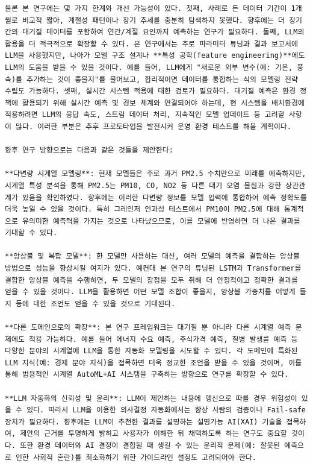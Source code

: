 \documentclass[12pt,ko,a4,]{report}
\begin{document}
\begin{lstlisting}
물론 본 연구에는 몇 가지 한계와 개선 가능성이 있다. 첫째, 사례로 든 데이터 기간이 1개월로 비교적 짧아, 계절성 패턴이나 장기 추세를 충분히 탐색하지 못했다. 향후에는 더 장기간의 대기질 데이터를 포함하여 연간/계절 요인까지 예측하는 연구가 필요하다. 둘째, LLM의 활용을 더 적극적으로 확장할 수 있다. 본 연구에서는 주로 파라미터 튜닝과 결과 보고서에 LLM을 사용했지만, 나아가 모델 구조 설계나 **특성 공학(feature engineering)**에도 LLM의 도움을 받을 수 있을 것이다. 예를 들어, LLM에게 "새로운 외부 변수(예: 기온, 풍속)를 추가하는 것이 좋을지"를 물어보고, 합리적이면 데이터를 통합하는 식의 모델링 전략 수립도 가능하다. 셋째, 실시간 시스템 적용에 대한 검토가 필요하다. 대기질 예측은 환경 정책에 활용되기 위해 실시간 예측 및 경보 체계와 연결되어야 하는데, 현 시스템을 배치환경에 적용하려면 LLM의 응답 속도, 스트림 데이터 처리, 지속적인 모델 업데이트 등 고려할 사항이 많다. 이러한 부분은 추후 프로토타입을 발전시켜 운영 환경 테스트를 해볼 계획이다.

향후 연구 방향으로는 다음과 같은 것들을 제안한다:

**다변량 시계열 모델링**: 현재 모델들은 주로 과거 PM2.5 수치만으로 미래를 예측하지만, 시계열 특성 분석을 통해 PM2.5는 PM10, CO, NO2 등 다른 대기 오염 물질과 강한 상관관계가 있음을 확인하였다. 향후에는 이러한 다변량 정보를 모델 입력에 통합하여 예측 정확도를 더욱 높일 수 있을 것이다. 특히 그레인저 인과성 테스트에서 PM10이 PM2.5에 대해 통계적으로 유의미한 예측력을 가지는 것으로 나타났으므로, 이를 모델에 반영하면 더 나은 결과를 기대할 수 있다.

**앙상블 및 복합 모델**: 한 모델만 사용하는 대신, 여러 모델의 예측을 결합하는 앙상블 방법으로 성능을 향상시킬 여지가 있다. 예컨대 본 연구의 튜닝된 LSTM과 Transformer를 결합한 앙상블 예측을 수행하면, 두 모델의 장점을 모두 취해 더 안정적이고 정확한 결과를 얻을 수 있을 것이다. LLM을 활용하면 어떤 모델 조합이 좋을지, 앙상블 가중치를 어떻게 둘지 등에 대한 조언도 얻을 수 있을 것으로 기대된다.

**다른 도메인으로의 확장**: 본 연구 프레임워크는 대기질 뿐 아니라 다른 시계열 예측 문제에도 적용 가능하다. 예를 들어 에너지 수요 예측, 주식가격 예측, 질병 발생률 예측 등 다양한 분야의 시계열에 LLM을 통한 자동화 모델링을 시도할 수 있다. 각 도메인에 특화된 LLM 지식(예: 경제 분야 지식)을 접목하면 더욱 정교한 조언을 받을 수 있을 것이며, 이를 통해 범용적인 시계열 AutoML+AI 시스템을 구축하는 방향으로 연구를 확장할 수 있다.

**LLM 자동화의 신뢰성 및 윤리**: LLM이 제안하는 내용에 맹신으로 따를 경우 위험성이 있을 수 있다. 따라서 LLM을 이용한 의사결정 자동화에서는 항상 사람의 검증이나 Fail-safe 장치가 필요하다. 향후에는 LLM이 추천한 결과를 설명하는 설명가능 AI(XAI) 기술을 접목하여, 제안의 근거를 투명하게 밝히고 사용자가 이해한 뒤 채택하도록 하는 연구도 중요할 것이다. 또한 환경 데이터와 AI 결정이 결합될 때 생길 수 있는 윤리적 문제(예: 잘못된 예측으로 인한 사회적 혼란)를 최소화하기 위한 가이드라인 설정도 고려되어야 한다.


\end{lstlisting}
\end{document}
